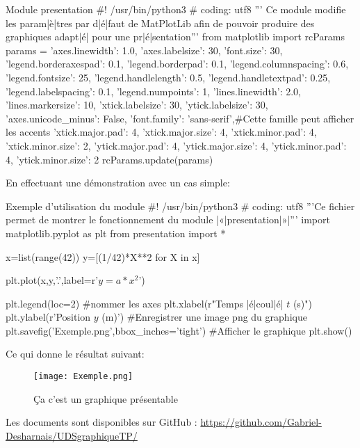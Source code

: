 \documentclass{article}
\begin{document}
\auteurB{  }
\auteurC{  }
\date{November 2016}


\entete

    \begin{pythoncode}{Module presentation}
#! /usr/bin/python3
# coding: utf8
''' Ce module modifie les param|è|tres par d|é|faut de MatPlotLib afin de pouvoir produire
des graphiques adapt|é| pour une pr|é|sentation'''
from matplotlib import rcParams
params = {'axes.linewidth': 1.0,
    'axes.labelsize': 30,
    'font.size': 30,
    'legend.borderaxespad': 0.1,
    'legend.borderpad': 0.1,
    'legend.columnspacing': 0.6,
    'legend.fontsize': 25,
    'legend.handlelength': 0.5,
    'legend.handletextpad': 0.25,
    'legend.labelspacing': 0.1,
    'legend.numpoints': 1,
    'lines.linewidth': 2.0,
    'lines.markersize': 10,
    'xtick.labelsize': 30,
    'ytick.labelsize': 30,
    'axes.unicode_minus': False,
    'font.family': 'sans-serif',#Cette famille peut afficher les accents
    'xtick.major.pad': 4,
    'xtick.major.size': 4,
    'xtick.minor.pad': 4,
    'xtick.minor.size': 2,    
    'ytick.major.pad': 4,
    'ytick.major.size': 4,
    'ytick.minor.pad': 4,
    'ytick.minor.size': 2}
rcParams.update(params)
    \end{pythoncode}
    En effectuant une démonstration avec un cas simple:
    \begin{pythoncode}{Exemple d'utilisation du module}
#! /usr/bin/python3
# coding: utf8
'''Ce fichier permet de montrer le fonctionnement du module |«|presentation|»|'''
import matplotlib.pyplot as plt
from presentation import *

x=list(range(42))
y=[(1/42)*X**2  for X in x]

plt.plot(x,y,'.',label=r'$y=a*x^{2}$')

plt.legend(loc=2)
#nommer les axes
plt.xlabel(r"Temps |é|coul|é| $t$ (s)")
plt.ylabel(r'Position $y$ (m)')
#Enregistrer une image png du graphique
plt.savefig('Exemple.png',bbox_inches='tight')
#Afficher le graphique
plt.show()
    \end{pythoncode}
    Ce qui donne le résultat suivant:
    \begin{figure}[ht]
        \centering
        \texttt{[image: Exemple.png]}
        \caption{Ça c'est un graphique présentable}
        \label{BoI}
    \end{figure}
    Les documents sont disponibles sur GitHub : \url{https://github.com/Gabriel-Desharnais/UDSgraphiqueTP/}
\end{document}
